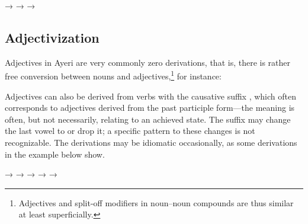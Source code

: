 \pex
	\a {}
		→ 
	\a {}
		→ 
	\a {}
		→ 
\xe


\subsection{Adjectivization}

Adjectives in Ayeri are very commonly zero derivations, that is, 
there is rather free conversion between nouns and 
adjectives,\footnote{Adjectives and split-off modifiers in noun--noun compounds 
are thus similar at least superficially.} for instance:

\pex
	\a {}
		\til{} 
	\a {}
		\til{} 
	\a {}
		\til{} 
	\a {}
		\til{} 
	\a {}
		\til{} 
\xe

Adjectives can also be derived from verbs with the causative suffix 
, which often corresponds to adjectives derived from the 
past participle form---the meaning is often, but not necessarily, relating to 
an achieved state. The suffix may change the last vowel to  or drop 
it; a specific pattern to these changes is not recognizable. The derivations 
may be idiomatic occasionally, as some derivations in the example below show.

\pex
	\a {}
		→ 
	\a {}
		→ 
	\a {}
		→ 
	\a {}
		→ 
	\a {}
		→ 
\xe

